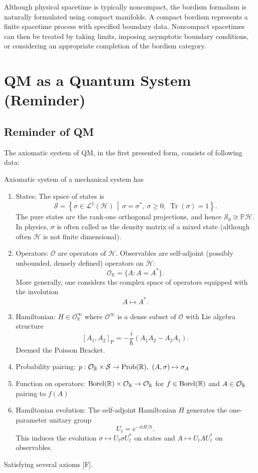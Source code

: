 \documentclass[a4paper,11pt]{article}
\begin{document}
\begin{remark}
    Although physical spacetime is typically noncompact, the bordism formalism is naturally formulated using compact manifolds. A compact bordism represents a finite spacetime process with specified boundary data. Noncompact spacetimes can then be treated by taking limits, imposing asymptotic boundary conditions, or considering an appropriate completion of the bordism category.
\end{remark}

\section{QM as a Quantum System (Reminder)}

\subsection{Reminder of QM}
The axiomatic system of QM, in the first presented form, consists of following data:
\begin{statement}[Mechanics]
    Axiomatic system of a mechanical system has
    \begin{enumerate}
         \item States: The space of states is \[ \mathcal S = \left\{ \sigma\in\mathcal L^1(\mathcal H) \,\middle|\, \sigma=\sigma^*,\ \sigma\geq0,\ \operatorname{Tr}(\sigma)=1 \right\}.\] The pure states are the rank-one orthogonal projections, and hence $\mathcal{S}_0 \cong \mathbb{P}\mathcal{H}$. In physics, $\sigma$ is often called as the density matrix of a mixed state (although often $\mathcal{H}$ is not finite dimensional).
        \item Operators: $\mathcal{O}$ are operators of $\mathcal{H}$. Observables are self-adjoint (possibly unbounded, densely defined) operators on \(\mathcal H\):
        \[
        \mathcal O_{\mathbb R}=\{A:A=A^*\}.
        \]
        More generally, one considers the complex space of operators equipped with the involution
        \[ A\longmapsto A^*.\]
        \item Hamiltonian: $H \in \mathcal{O}^{\infty}_{\mathbb R}$ where $\mathcal{O}^\infty $ is a dense subset of $\mathcal{O}$ with Lie algebra structure
        \[
        [A_1,A_2]_{\mathrm{P}}=-\frac{i}{\hbar}(A_1A_2-A_2A_1).
        \]
        Deemed the Poisson Bracket.
        \item Probability pairing: $p: \mathcal{O}_{\mathbb{R}} \times \mathcal{S} \to {\rm Prob}({\mathbb{R}}), ~(A,\sigma) \mapsto \sigma_A $
        \item Function on operators: ${\rm Borel}(\mathbb{R}) \times \mathcal{O}_{\mathbb{R}} \to \mathcal{O}_{\mathbb{R}}$ for $f \in {\rm Borel}(\mathbb{R})$ and $A \in \mathcal{O_{\mathbb{R}}}$ pairing to $f(A)$ 
        \item Hamiltonian evolution: The self-adjoint Hamiltonian \(H\) generates the one-parameter unitary group \[
        U_t=e^{-itH/\hbar}.
        \] This induces the evolution $\sigma\longmapsto U_t\sigma U_t^*$ on states and $A\longmapsto U_tAU_t^*$ on observables.
    \end{enumerate}
    Satisfying several axioms [F].
\end{statement}
\end{document}
